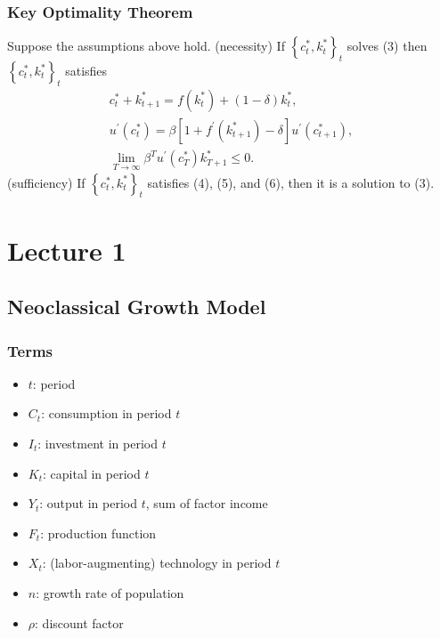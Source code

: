 \documentclass[10pt]{article}
\begin{document}
\subsubsection{Key Optimality Theorem}

\begin{theorem}
    
    Suppose the assumptions above hold.
(necessity) If $\left\{c_t^*, k_t^*\right\}_t$ solves (3) then $\left\{c_t^*, k_t^*\right\}_t$ satisfies
$$
\begin{gathered}
c_t^*+k_{t+1}^*=f\left(k_t^*\right)+(1-\delta) k_t^*, \\
u^{\prime}\left(c_t^*\right)=\beta\left[1+f^{\prime}\left(k_{t+1}^*\right)-\delta\right] u^{\prime}\left(c_{t+1}^*\right), \\
\lim _{T \rightarrow \infty} \beta^T u^{\prime}\left(c_T^*\right) k_{T+1}^* \leq 0 .
\end{gathered}
$$
(sufficiency) If $\left\{c_t^*, k_t^*\right\}_t$ satisfies (4), (5), and (6), then it is a solution to (3).

\end{theorem}

\section{Lecture 1}

\subsection{Neoclassical Growth Model}

\subsubsection{Terms}

\begin{itemize}
    \item $t$: period
    \item $C_t$: consumption in period $t$
    \item $I_t$: investment in period $t$
    \item $K_t$: capital in period $t$
    \item $Y_t$: output in period $t$, sum of factor income
    \item $F_t$: production function
    \item $X_t$: (labor-augmenting) technology in period $t$
    \item $n$: growth rate of population
    \item $\rho$: discount factor
\end{itemize}
\end{document}
